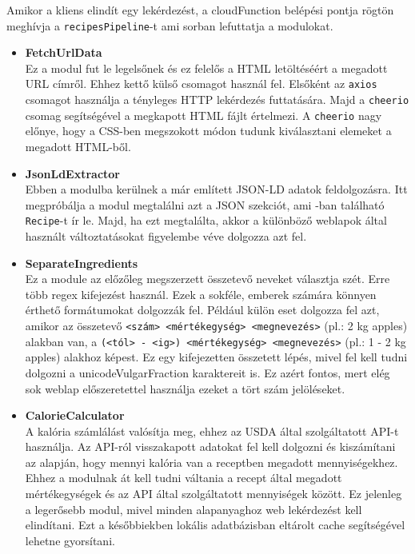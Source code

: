 \documentclass[12pt]{report}
\theoremstyle{definition}
\begin{document}
Amikor a kliens elindít egy lekérdezést, a \gls{cloudFunction} belépési pontja rögtön meghívja a \verb+recipesPipeline+-t ami sorban lefuttatja a modulokat.


\begin{itemize}
	\item \textbf{FetchUrlData} \\
	Ez a modul fut le legelsőnek és ez felelős a HTML letöltéséért a megadott URL címről. Ehhez kettő külső csomagot használ fel.
	Elsőként az \verb+axios+ csomagot használja a tényleges \Gls{HTTP} lekérdezés futtatására. Majd a \verb+cheerio+ csomag segítségével a megkapott HTML fájlt értelmezi. 
	A \verb+cheerio+ nagy előnye, hogy a CSS-ben megszokott módon tudunk kiválasztani elemeket a megadott HTML-ből. 

	\item \textbf{JsonLdExtractor} \\
	Ebben a modulba kerülnek a már említett JSON-LD adatok feldolgozásra. Itt megpróbálja a modul megtalálni azt a \Gls{JSON} szekciót, ami -ban található \texttt{Recipe}-t ír le.
	Majd, ha ezt megtalálta, akkor a különböző weblapok által használt változtatásokat figyelembe véve dolgozza azt fel. 

	\item \textbf{SeparateIngredients} \\
	Ez a module az előzőleg megszerzett összetevő neveket választja szét. Erre több \Gls{regex} kifejezést használ. Ezek a sokféle, emberek számára könnyen érthető formátumokat dolgozzák fel. 
	Például külön eset dolgozza fel azt, amikor az összetevő \texttt{<szám> <mértékegység> <megnevezés>} (pl.: 2 kg apples) alakban van, a \texttt{(<tól> - <ig>) <mértékegység> <megnevezés>} (pl.: 1 - 2 kg apples) alakhoz képest. 
	Ez egy kifejezetten  összetett lépés, mivel fel kell tudni dolgozni a \Gls{unicodeVulgarFraction} karaktereit is. Ez azért fontos, mert elég sok weblap előszeretettel használja ezeket a tört szám jelöléseket.

	\item \textbf{CalorieCalculator} \\
	A kalória számlálást valósítja meg, ehhez az \Gls{USDA} által szolgáltatott \Gls{API}-t használja. 
	Az API-ról visszakapott adatokat fel kell dolgozni és kiszámítani az alapján, hogy mennyi kalória van a receptben megadott mennyiségekhez. 
	Ehhez a modulnak át kell tudni váltania a recept által megadott mértékegységek és az API által szolgáltatott mennyiségek között. 
	Ez jelenleg a legerősebb modul, mivel minden alapanyaghoz web lekérdezést kell elindítani. Ezt a későbbiekben lokális adatbázisban eltárolt \gls{cache} segítségével lehetne gyorsítani.

\end{itemize}
\end{document}

